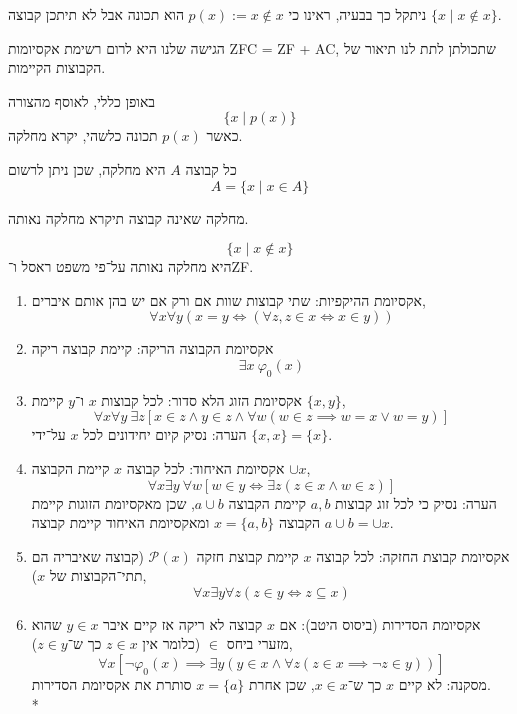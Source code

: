 ניתקל כך בבעיה, ראינו כי $p(x) := x \notin x$ הוא תכונה אבל לא תיתכן קבוצה $\{ x \mid x \notin x \}$.

הגישה שלנו היא לרום רשימת אקסיומות ZFC = ZF + AC, שתכולתן לתת לנו תיאור של הקבוצות הקיימות.
\begin{remark}
	באופן כללי, לאוסף מהצורה
	\[
		\{ x \mid p(x) \}
	\]
	כאשר $p(x)$ תכונה כלשהי, יקרא מחלקה.
\end{remark}
\begin{remark}
	כל קבוצה $A$ היא מחלקה, שכן ניתן לרשום
	\[
		A = \{ x \mid x \in A \}
	\]
\end{remark}
מחלקה שאינה קבוצה תיקרא מחלקה נאותה.
\begin{example}
	\[
		\{ x \mid x \notin x\}
	\]
	היא מחלקה נאותה על־פי משפט ראסל ו־ZF. %
\end{example}
\begin{definition}[המערכת ZF]
	\begin{enumerate}
		\item אקסיומת ההיקפיות:
			שתי קבוצות שוות אם ורק אם יש בהן אותם איברים,
			\[
				\forall x \forall y ( x = y \iff (\forall z, z \in x \iff x \in y))
			\]
		\item אקסיומת הקבוצה הריקה:
			קיימת קבוצה ריקה
			\[
				\exists x\ \varphi_0(x)
			\]
		\item אקסיומת הזוג הלא סדור:
			לכל קבוצות $x$ ו־$y$ קיימת $\{x, y\}$,
			\[
				\forall x \forall y \ \exists z [ x \in z \land y \in z \land \forall w (w \in z \implies w = x \lor w = y)]
			\]
			הערה: נסיק קיום יחידונים לכל $x$ על־ידי $\{ x, x \} = \{ x \}$.
		\item אקסיומת האיחוד:
			לכל קבוצה $x$ קיימת הקבוצה $\cup x$,
			\[
				\forall x \exists y \ \forall w [w \in y \iff \exists z (z \in x \land w \in z)]
			\]
			הערה: נסיק כי לכל זוג קבוצות $a, b$ קיימת הקבוצה $a \cup b$, שכן מאקסיומת הזוגות קיימת הקבוצה $x = \{ a, b \}$ ומאקסיומת האיחוד קיימת קבוצה $a \cup b = \cup x$.
		\item אקסיומת קבוצת החזקה:
			לכל קבוצה $x$ קיימת קבוצת חזקה $\mathcal{P}(x)$ (קבוצה שאיבריה הם תתי־הקבוצות של $x$),
			\[
				\forall x\exists y \forall z (z \in y \iff z \subseteq x)
			\]
		\item אקסיומת הסדירות (ביסוס היטב):
			אם $x$ קבוצה לא ריקה אז קיים איבר $y \in x$ שהוא מזערי ביחס $\in$ (כלומר אין $z \in x$ כך ש־$z \in y$),
			\[
				\forall x [ \lnot \varphi_0(x) \implies \exists y ( y \in x \land \forall z (z \in x \implies \lnot z \in y))]
			\]
			מסקנה: לא קיים $x$ כך ש־$x \in x$, שכן אחרת $x = \{ a \}$ סותרת את אקסיומת הסדירות. \\*

\end{enumerate}
\end{definition}
